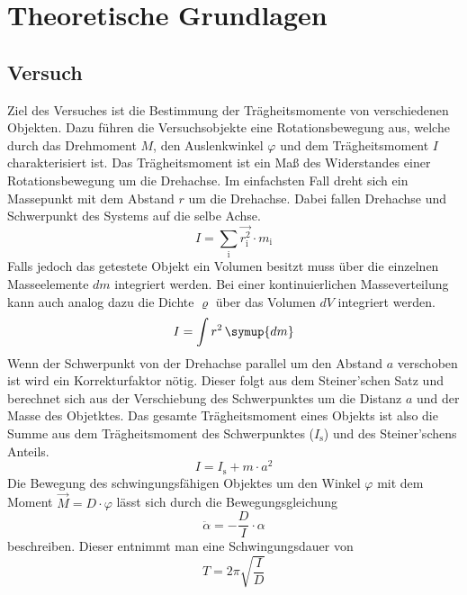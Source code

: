 \section{Theoretische Grundlagen}
\label{sec:Theorie}
\subsection{Versuch}
Ziel des Versuches ist die Bestimmung der Trägheitsmomente von verschiedenen Objekten. Dazu führen die Versuchsobjekte eine Rotationsbewegung aus, welche durch das Drehmoment $M$, den Auslenkwinkel $\varphi$ und dem Trägheitsmoment $I$ charakterisiert ist.
\newline \newline
Das Trägheitsmoment ist ein Maß des Widerstandes einer Rotationsbewegung um die Drehachse. Im einfachsten Fall dreht sich ein Massepunkt mit dem Abstand $r$ um die Drehachse. Dabei fallen Drehachse und Schwerpunkt des Systems auf die selbe Achse.
\begin{equation}
	I = \sum_\text{i} \vec{r_\text{i}^2}  \cdot  m_\text{i}
\end{equation}
Falls jedoch das getestete Objekt ein Volumen besitzt muss über die einzelnen Masseelemente $dm$ integriert werden. Bei einer kontinuierlichen Masseverteilung kann auch analog dazu die Dichte $\varrho$ über das Volumen $dV$ integriert werden.
\begin{equation}
	I = \int{ r^2 \, \symup{dm}}
\end{equation}
Wenn der Schwerpunkt von der Drehachse parallel um den Abstand $a$ verschoben ist wird ein Korrekturfaktor nötig. Dieser folgt aus dem Steiner'schen Satz und berechnet sich aus der Verschiebung des Schwerpunktes um die Distanz $a$ und der Masse des Objetktes. Das gesamte Trägheitsmoment eines Objekts ist also die Summe aus dem Trägheitsmoment des Schwerpunktes ($I_\text{s}$) und des Steiner'schens Anteils.
\begin{equation}
	\label{eqn:Steiner}
	I = I_\text{s} + m  \cdot a^2
\end{equation}
Die Bewegung des schwingungsfähigen Objektes um den Winkel $\varphi$ mit dem Moment $\vec{M} = D \cdot  \varphi$ lässt sich durch die  Bewegungsgleichung
\begin{equation}
\ddot{\alpha}= - \frac{D}{I} \cdot \alpha
\end{equation}
beschreiben. Dieser entnimmt man eine Schwingungsdauer von
\begin{equation}
	\label{eqn:Schwingungsdauer}
	T = 2 \pi \sqrt{\frac{I}{D}}
\end{equation}


